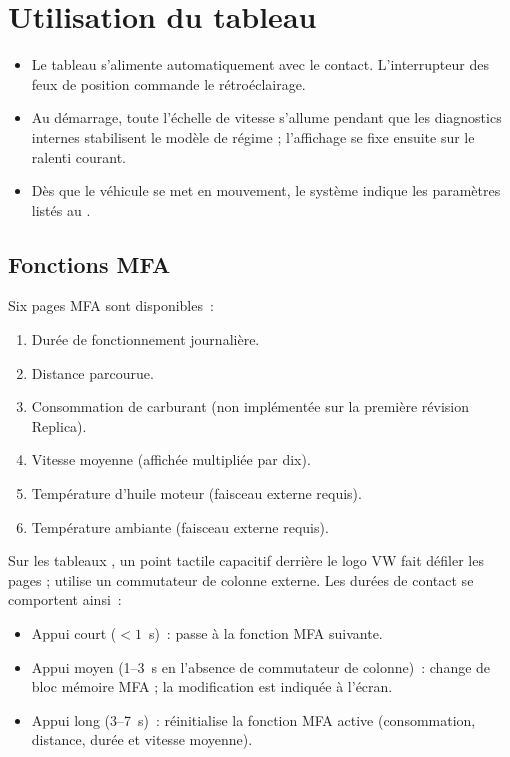 \section{Utilisation du tableau}
\begin{itemize}
    \item Le tableau s'alimente automatiquement avec le contact. L'interrupteur des feux de position commande le rétroéclairage.
    \item Au démarrage, toute l'échelle de vitesse s'allume pendant que les diagnostics internes stabilisent le modèle de régime ; l'affichage se fixe ensuite sur le ralenti courant.
    \item Dès que le véhicule se met en mouvement, le système indique les paramètres listés au .
\end{itemize}

\subsection{Fonctions MFA}
Six pages MFA sont disponibles~:
\begin{enumerate}
    \item Durée de fonctionnement journalière.
    \item Distance parcourue.
    \item Consommation de carburant (non implémentée sur la première révision Replica).
    \item Vitesse moyenne (affichée multipliée par dix).
    \item Température d'huile moteur (faisceau externe requis).
    \item Température ambiante (faisceau externe requis).
\end{enumerate}
Sur les tableaux \ReplicaGenOneShort{}, un point tactile capacitif derrière le logo VW fait défiler les pages ; \ReplicaNextShort{} utilise un commutateur de colonne externe. Les durées de contact se comportent ainsi~:
\begin{itemize}
    \item Appui court (\(<1\)~s)~: passe à la fonction MFA suivante.
    \item Appui moyen (1--3~s en l'absence de commutateur de colonne)~: change de bloc mémoire MFA ; la modification est indiquée à l'écran.
    \item Appui long (3--7~s)~: réinitialise la fonction MFA active (consommation, distance, durée et vitesse moyenne).
\end{itemize}

